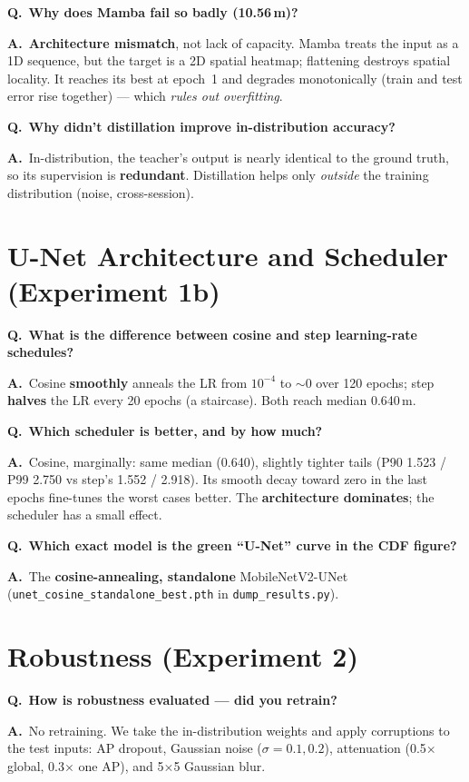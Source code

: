 \documentclass[11pt]{article}
\newcommand{\Q}[1]{\medskip\noindent\textbf{\textcolor{blue!50!black}{Q.}}\ \textbf{#1}\par\nopagebreak}
\newcommand{\A}{\noindent\textbf{A.}\ }
\begin{document}
\Q{Why does Mamba fail so badly (10.56\,m)?}
\A \textbf{Architecture mismatch}, not lack of capacity. Mamba treats the input as a 1D sequence, but the
target is a 2D spatial heatmap; flattening destroys spatial locality. It reaches its best at epoch~1 and
degrades monotonically (train and test error rise together) --- which \emph{rules out overfitting}.

\Q{Why didn't distillation improve in-distribution accuracy?}
\A In-distribution, the teacher's output is nearly identical to the ground truth, so its supervision is
\textbf{redundant}. Distillation helps only \emph{outside} the training distribution (noise,
cross-session).

\section{U-Net Architecture and Scheduler (Experiment 1b)}

\Q{What is the difference between cosine and step learning-rate schedules?}
\A Cosine \textbf{smoothly} anneals the LR from $10^{-4}$ to $\sim$0 over 120 epochs; step \textbf{halves}
the LR every 20 epochs (a staircase). Both reach median 0.640\,m.

\Q{Which scheduler is better, and by how much?}
\A Cosine, marginally: same median (0.640), slightly tighter tails (P90 1.523 / P99 2.750 vs step's
1.552 / 2.918). Its smooth decay toward zero in the last epochs fine-tunes the worst cases better. The
\textbf{architecture dominates}; the scheduler has a small effect.

\Q{Which exact model is the green ``U-Net'' curve in the CDF figure?}
\A The \textbf{cosine-annealing, standalone} MobileNetV2-UNet (\texttt{unet\_cosine\_standalone\_best.pth}
in \texttt{dump\_results.py}).

\section{Robustness (Experiment 2)}

\Q{How is robustness evaluated --- did you retrain?}
\A No retraining. We take the in-distribution weights and apply corruptions to the test inputs: AP
dropout, Gaussian noise ($\sigma{=}0.1,0.2$), attenuation (0.5$\times$ global, 0.3$\times$ one AP), and
5$\times$5 Gaussian blur.
\end{document}
